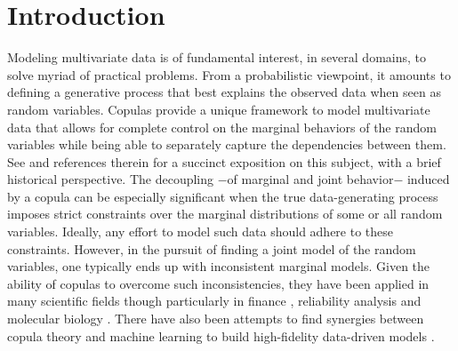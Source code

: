 \documentclass{article}
\theoremstyle{plain}
\theoremstyle{definition}
\theoremstyle{remark}
\begin{document}
\begin{abstract}

\end{abstract}

 


 


\section{Introduction}\label{sec:Intro}

Modeling multivariate data is of fundamental interest, in several domains, to solve myriad of practical problems. From a probabilistic viewpoint, it amounts to defining a generative process that best explains the observed data when seen as random variables. Copulas provide a unique framework to model multivariate data that allows for complete control on the marginal behaviors of the random variables while being able to separately capture the dependencies between them. See \citep{Durante2010CopulaIntro} and references therein for a succinct exposition on this subject, with a brief historical perspective.  The decoupling $-$of marginal and joint behavior$-$ induced by a copula can be especially significant when the true data-generating process imposes strict constraints over the marginal distributions of some or all random variables. Ideally, any effort to model such data should adhere to these constraints. However, in the pursuit of finding a joint model of the random variables, one typically ends up with inconsistent marginal models.  Given the ability of copulas to overcome such inconsistencies, they have been applied in many scientific fields though particularly in finance \citep{Genest2009CopulaInFinance,Cherubini2004copula}, reliability analysis \citep{Rychlik2010Reliability} and molecular biology \citep{Bilgrau2012quantification,Li2011,Kim2008,Ma2012Gini}.  There have also been  attempts to find synergies between copula theory and machine learning to build high-fidelity data-driven models \citep[see][for a survey on the applications of copulas in machine learning approaches]{Elidan2013}.
\end{document}
